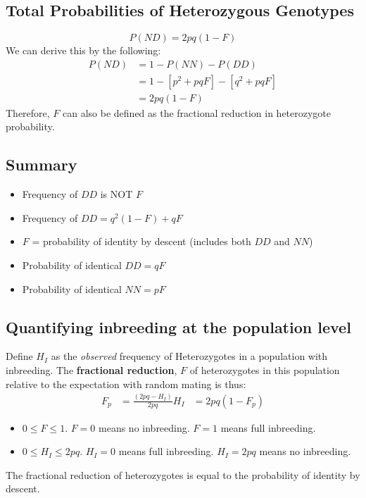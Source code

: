 \documentclass[10pt]{article}
\begin{document}
\subsection*{Total Probabilities of Heterozygous Genotypes}
\[P(ND) = 2pq (1 - F)\]
We can derive this by the following:
\begin{align*}
    P(ND) &= 1 - P(NN) - P(DD) \\
    &= 1 - [p^2 + pqF] - [q^2 + pqF] \\
    &= 2pq (1 - F)
\end{align*}
Therefore, $F$ can also be defined as the fractional reduction in heterozygote probability.

\subsection*{Summary}
\begin{itemize}
	\item Frequency of $DD$ is NOT $F$
	\item Frequency of $DD = q^2 (1 - F) + qF$
	\item $F$ = probability of identity by descent (includes both $DD$ and $NN$)
	\item Probability of identical $DD = qF$
	\item Probability of identical $NN = pF$
\end{itemize}

\subsection*{Quantifying inbreeding at the population level}
Define $H_I$ as the \textit{observed} frequency of Heterozygotes in a population with inbreeding.  The \textbf{fractional reduction}, $F$ of heterozygotes in this population relative to the expectation with random mating is thus:
\begin{align*}
    F_p &= \frac{(2pq - H_I)}{2pq}
    H_I &= 2pq (1 - F_p)
\end{align*}
\begin{itemize}
	\item $0 \leq F \leq 1$.  $F = 0$ means no inbreeding.  $F = 1$ means full inbreeding.
	\item $0 \leq H_I \leq 2pq$.  $H_I = 0$ means full inbreeding.  $H_I = 2pq$ means no inbreeding.
\end{itemize}
The fractional reduction of heterozygotes is equal to the probability of identity by descent.
\end{document}
